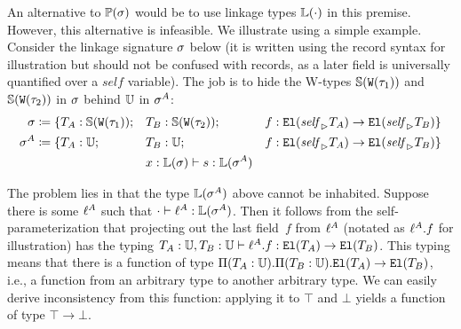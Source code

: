 
An alternative to $\mathbb{P}({\sigma})$ would be to use linkage types $\mathbb{L}({\cdot})$ in this premise.
However, this alternative is infeasible.
We illustrate using a simple example.
Consider the linkage signature $\sigma$ below (it is written using the record
syntax for illustration but should not be confused with records, as a later field
is universally quantified over a $\mathit{self}$ variable).
The job is to hide the W-types $\mathbb{S}({\texttt{W}({\tau_1})})$ and
$\mathbb{S}({\texttt{W}({\tau_2})})$ in $\sigma$ behind $\mathbb{U}$ in $\sigma^A$:
%
\begin{align*}
  \sigma &\coloneq \{ T_A : \mathbb{S}({\texttt{W}({\tau_1})}); &&T_B : \mathbb{S}({\texttt{W}({\tau_2})}); &&f : \texttt{El}({{\mathit{self}}_{\rhd}{T_A}}) \to \texttt{El}({{\mathit{self}}_{\rhd}{T_B}}) \} \\
  \sigma^A &\coloneq \{T_A : \mathbb{U}; &&T_B : \mathbb{U}; &&f : \texttt{El}({{\mathit{self}}_{\rhd}{T_A}}) \to \texttt{El}({{\mathit{self}}_{\rhd}{T_B}}) \} \\
  & &&  {x : \mathbb{L}({\sigma})} \vdash {\ensuremath{s}} : {\mathbb{L}({\sigma^A})} 
\end{align*}


The problem lies in that the type $\mathbb{L}({\sigma^A})$ above cannot be inhabited.
Suppose there is some $\ell^A$ such that $\cdot \vdash \ell^A : \mathbb{L}({\sigma^A})$.
Then it follows from the self-parameterization that projecting out the last field~$f$
from $\ell^A$ (notated as $\ell^A.f$ for illustration) has the typing
$ {T_A : \mathbb{U}, T_B: \mathbb{U}} \vdash {\ensuremath{\ell}^A.f} : {\texttt{El}({T_A}) \to \texttt{El}({T_B})} $.
This typing means that there is a function of type
$\Pi({T_A}:{\mathbb{U}}).{\Pi({T_B}:{\mathbb{U}}).{\texttt{El}({T_A})
\to \texttt{El}({T_B})}}$, i.e., a function from an arbitrary type to another arbitrary
type. We can easily derive inconsistency from this function:
applying it to $\top$ and $\bot$ yields a function of type $\top\to\bot$.

